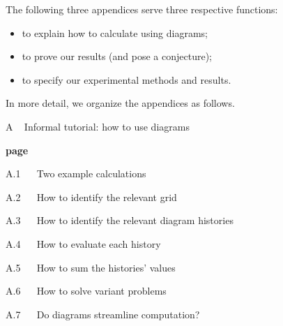         The following three appendices serve three respective functions:
        \begin{itemize}[noitemsep]
            \item to explain how to calculate using diagrams;
            \item to prove our results (and pose a conjecture);
            \item to specify our experimental methods and results.
        \end{itemize}




        In more detail, we organize the appendices as follows.\\
    
        {\bf
        \par\noindent A ~ Informal tutorial: how to use diagrams}               \hfill {\bf page \pageref{appendix:tutorial}}
        \par\indent     A.1 ~~ Two example calculations                         \hfill \pageref{appendix:example}
        \par\indent     A.2 ~~ How to identify the relevant grid                \hfill \pageref{appendix:draw-spacetime} 
        \par\indent     A.3 ~~ How to identify the relevant diagram histories   \hfill \pageref{appendix:draw-histories}
        \par\indent     A.4 ~~ How to evaluate each history                     \hfill \pageref{appendix:evaluate-histories}
        \par\indent     A.5 ~~ How to sum the histories' values                 \hfill \pageref{appendix:sum-histories}
        \par\indent     A.6 ~~ How to solve variant problems                    \hfill \pageref{appendix:solve-variants}
        \par\indent     A.7 ~~ Do diagrams streamline computation?              \hfill \pageref{appendix:diagrams-streamline}
    
